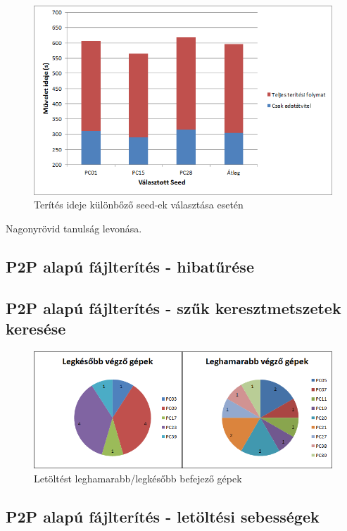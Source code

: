 \begin{figure}[ht]
\centering
\includegraphics[width=120mm, keepaspectratio]{figures/Perf_different_seeds.png}
\caption{Terítés ideje különbőző seed-ek választása esetén}
\label{fig:differentseedscomparison}
\end{figure}

Nagonyrövid tanulság levonása.

%
\subsection{P2P alapú fájlterítés - hibatűrése}
%

%
\subsection{P2P alapú fájlterítés - szűk keresztmetszetek keresése}
%

\begin{figure}[ht]
\centering
\includegraphics[width=150mm, keepaspectratio]{figures/Perf_computers.png}
\caption{Letöltést leghamarabb/legkésőbb befejező gépek}
\label{fig:computerdownloadspeeds}
\end{figure}

%
\subsection{P2P alapú fájlterítés - letöltési sebességek}
%

